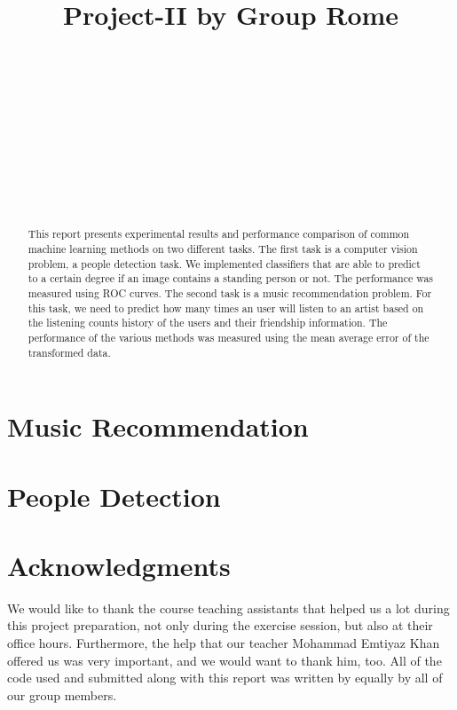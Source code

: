 \documentclass{article} %
\title{Project-II by Group Rome}
\author{
\fontsize{8}{8}\selectfont{Cimen Gokcen}\\
\fontsize{8}{8}\selectfont{EPFL} \\
\fontsize{8}{8}\selectfont{\texttt{gokcen.cimen@epfl.ch}} \\
\And
\fontsize{8}{8}\selectfont{Angelopoulos Vasileios} \\
\fontsize{8}{8}\selectfont{EPFL} \\
\fontsize{8}{8}\selectfont{\texttt{vasileios.angelopoulos@epfl.ch}} \\
\And
\fontsize{8}{8}\selectfont{Petrescu Viviana}\\
\fontsize{8}{8}\selectfont{EPFL} \\
\fontsize{8}{8}\selectfont{\texttt{viviana.petrescu@epfl.ch}} \\
}
\begin{document}
\maketitle

\begin{abstract}
This report presents experimental results and performance comparison of common machine learning methods on two different tasks. The first task is a computer vision problem, a people detection task. We implemented classifiers that are able to predict to a certain degree if an image contains a standing person or not. The performance was measured using ROC curves. The second task is a music recommendation problem. For this task, we need to predict how many times an user will listen to an artist based on the listening counts history of the users and their friendship information. The performance of the various methods was measured using the mean average error of the transformed data.
\end{abstract}

\section{Music Recommendation}


\section{People Detection}


\section*{Acknowledgments}
We would like to thank the course teaching assistants that helped us a lot during this project preparation, not only during the exercise session, but also at their office hours. Furthermore, the help that our teacher Mohammad Emtiyaz Khan offered us was very  important, and we would want to thank him, too. All of the code used and submitted along with this report was written by equally by all of our group members.



\end{document}
